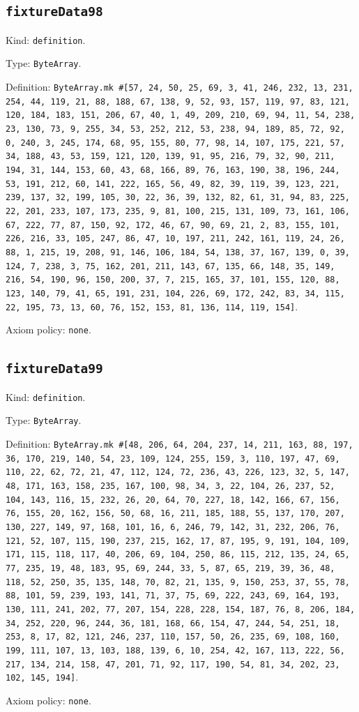 \documentclass[11pt]{article}
\begin{document}
\subsection*{\texttt{fixtureData98}}
\noindent Kind: \texttt{definition}.\par
\noindent Type: \texttt{ByteArray}.\par
\noindent Definition: \texttt{ByteArray.mk \#[57, 24, 50, 25, 69, 3, 41, 246, 232, 13, 231, 254, 44, 119, 21, 88, 188, 67, 138, 9, 52, 93, 157, 119, 97, 83, 121, 120, 184, 183, 151, 206, 67, 40, 1, 49, 209, 210, 69, 94, 11, 54, 238, 23, 130, 73, 9, 255, 34, 53, 252, 212, 53, 238, 94, 189, 85, 72, 92, 0, 240, 3, 245, 174, 68, 95, 155, 80, 77, 98, 14, 107, 175, 221, 57, 34, 188, 43, 53, 159, 121, 120, 139, 91, 95, 216, 79, 32, 90, 211, 194, 31, 144, 153, 60, 43, 68, 166, 89, 76, 163, 190, 38, 196, 244, 53, 191, 212, 60, 141, 222, 165, 56, 49, 82, 39, 119, 39, 123, 221, 239, 137, 32, 199, 105, 30, 22, 36, 39, 132, 82, 61, 31, 94, 83, 225, 22, 201, 233, 107, 173, 235, 9, 81, 100, 215, 131, 109, 73, 161, 106, 67, 222, 77, 87, 150, 92, 172, 46, 67, 90, 69, 21, 2, 83, 155, 101, 226, 216, 33, 105, 247, 86, 47, 10, 197, 211, 242, 161, 119, 24, 26, 88, 1, 215, 19, 208, 91, 146, 106, 184, 54, 138, 37, 167, 139, 0, 39, 124, 7, 238, 3, 75, 162, 201, 211, 143, 67, 135, 66, 148, 35, 149, 216, 54, 190, 96, 150, 200, 37, 7, 215, 165, 37, 101, 155, 120, 88, 123, 140, 79, 41, 65, 191, 231, 104, 226, 69, 172, 242, 83, 34, 115, 22, 195, 73, 13, 60, 76, 152, 153, 81, 136, 114, 119, 154]}.\par
\noindent Axiom policy: \texttt{none}.\par
\subsection*{\texttt{fixtureData99}}
\noindent Kind: \texttt{definition}.\par
\noindent Type: \texttt{ByteArray}.\par
\noindent Definition: \texttt{ByteArray.mk \#[48, 206, 64, 204, 237, 14, 211, 163, 88, 197, 36, 170, 219, 140, 54, 23, 109, 124, 255, 159, 3, 110, 197, 47, 69, 110, 22, 62, 72, 21, 47, 112, 124, 72, 236, 43, 226, 123, 32, 5, 147, 48, 171, 163, 158, 235, 167, 100, 98, 34, 3, 22, 104, 26, 237, 52, 104, 143, 116, 15, 232, 26, 20, 64, 70, 227, 18, 142, 166, 67, 156, 76, 155, 20, 162, 156, 50, 68, 16, 211, 185, 188, 55, 137, 170, 207, 130, 227, 149, 97, 168, 101, 16, 6, 246, 79, 142, 31, 232, 206, 76, 121, 52, 107, 115, 190, 237, 215, 162, 17, 87, 195, 9, 191, 104, 109, 171, 115, 118, 117, 40, 206, 69, 104, 250, 86, 115, 212, 135, 24, 65, 77, 235, 19, 48, 183, 95, 69, 244, 33, 5, 87, 65, 219, 39, 36, 48, 118, 52, 250, 35, 135, 148, 70, 82, 21, 135, 9, 150, 253, 37, 55, 78, 88, 101, 59, 239, 193, 141, 71, 37, 75, 69, 222, 243, 69, 164, 193, 130, 111, 241, 202, 77, 207, 154, 228, 228, 154, 187, 76, 8, 206, 184, 34, 252, 220, 96, 244, 36, 181, 168, 66, 154, 47, 244, 54, 251, 18, 253, 8, 17, 82, 121, 246, 237, 110, 157, 50, 26, 235, 69, 108, 160, 199, 111, 107, 13, 103, 188, 139, 6, 10, 254, 42, 167, 113, 222, 56, 217, 134, 214, 158, 47, 201, 71, 92, 117, 190, 54, 81, 34, 202, 23, 102, 145, 194]}.\par
\noindent Axiom policy: \texttt{none}.\par
\end{document}
